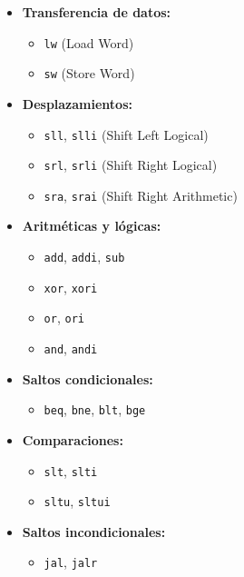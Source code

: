 \documentclass[conference]{IEEEtran}
\begin{document}
\begin{itemize}
    \item \textbf{Transferencia de datos:}
    \begin{itemize}
        \item \texttt{lw}  (Load Word)
        \item \texttt{sw}  (Store Word)
    \end{itemize}
    \item \textbf{Desplazamientos:}
    \begin{itemize}
        \item \texttt{sll}, \texttt{slli}  (Shift Left Logical)
        \item \texttt{srl}, \texttt{srli}  (Shift Right Logical)
        \item \texttt{sra}, \texttt{srai}  (Shift Right Arithmetic)
    \end{itemize}
    \item \textbf{Aritméticas y lógicas:}
    \begin{itemize}
        \item \texttt{add}, \texttt{addi}, \texttt{sub}
        \item \texttt{xor}, \texttt{xori}
        \item \texttt{or}, \texttt{ori}
        \item \texttt{and}, \texttt{andi}
    \end{itemize}
    \item \textbf{Saltos condicionales:}
    \begin{itemize}
        \item \texttt{beq}, \texttt{bne}, \texttt{blt}, \texttt{bge}
    \end{itemize}
    \item \textbf{Comparaciones:}
    \begin{itemize}
        \item \texttt{slt}, \texttt{slti}
        \item \texttt{sltu}, \texttt{sltui}
    \end{itemize}
    \item \textbf{Saltos incondicionales:}
    \begin{itemize}
        \item \texttt{jal}, \texttt{jalr}
    \end{itemize}
\end{itemize}

\end{document}
